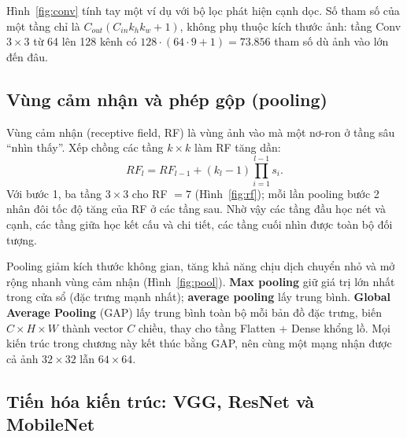 
Hình~\ref{fig:conv} tính tay một ví dụ với bộ lọc phát hiện cạnh dọc. Số tham số của một tầng chỉ là
$C_{out}(C_{in}k_hk_w + 1)$, không phụ thuộc kích thước ảnh: tầng Conv $3{\times}3$ từ 64 lên 128 kênh có
$128 \cdot (64 \cdot 9 + 1) = 73.856$ tham số dù ảnh vào lớn đến đâu.


\subsection{Vùng cảm nhận và phép gộp (pooling)}

Vùng cảm nhận (receptive field, RF) là vùng ảnh vào mà một nơ-ron ở tầng sâu “nhìn thấy”. Xếp chồng các tầng $k{\times}k$
làm RF tăng dần:
\begin{equation}
  RF_l = RF_{l-1} + (k_l - 1)\prod_{i=1}^{l-1} s_i .
\end{equation}
Với bước 1, ba tầng $3{\times}3$ cho RF $= 7$ (Hình~\ref{fig:rf}); mỗi lần pooling bước 2 nhân đôi tốc độ tăng của RF ở
các tầng sau. Nhờ vậy các tầng đầu học nét và cạnh, các tầng giữa học kết cấu và chi tiết, các tầng cuối nhìn được toàn bộ
đối tượng.


Pooling giảm kích thước không gian, tăng khả năng chịu dịch chuyển nhỏ và mở rộng nhanh vùng cảm nhận
(Hình~\ref{fig:pool}). \textbf{Max pooling} giữ giá trị lớn nhất trong cửa sổ (đặc trưng mạnh nhất);
\textbf{average pooling} lấy trung bình. \textbf{Global Average Pooling} (GAP) \cite{lin2013} lấy trung bình toàn bộ mỗi
bản đồ đặc trưng, biến $C{\times}H{\times}W$ thành vector $C$ chiều, thay cho tầng Flatten + Dense khổng lồ. Mọi kiến trúc
trong chương này kết thúc bằng GAP, nên cùng một mạng nhận được cả ảnh $32{\times}32$ lẫn $64{\times}64$.


\subsection{Tiến hóa kiến trúc: VGG, ResNet và MobileNet}

